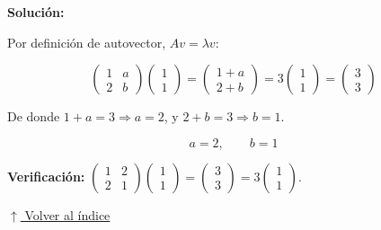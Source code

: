 \documentclass[12pt]{article}
\newcommand{\solucion}{%
    \vspace{0.8em}%
    \textbf{Solución:}%
    \vspace{0.8em}%
}
\newcommand{\volverindice}{%
    \vspace{1em}%
    \begin{flushright}%
        \hyperlink{indice}{\small $\uparrow$ Volver al índice}%
    \end{flushright}%
}
\begin{document}
\solucion

Por definición de autovector, $Av=\lambda v$:

\[
\begin{pmatrix}1&a\\2&b\end{pmatrix}\begin{pmatrix}1\\1\end{pmatrix}
=\begin{pmatrix}1+a\\2+b\end{pmatrix}
=3\begin{pmatrix}1\\1\end{pmatrix}=\begin{pmatrix}3\\3\end{pmatrix}
\]

De donde $1+a=3\Rightarrow a=2$, y $2+b=3\Rightarrow b=1$.

\[
\boxed{a=2,\qquad b=1}
\]

\textbf{Verificación:}
$\begin{pmatrix}1&2\\2&1\end{pmatrix}\begin{pmatrix}1\\1\end{pmatrix}
=\begin{pmatrix}3\\3\end{pmatrix}=3\begin{pmatrix}1\\1\end{pmatrix}$. \checkmark

\volverindice
\newpage
\end{document}
